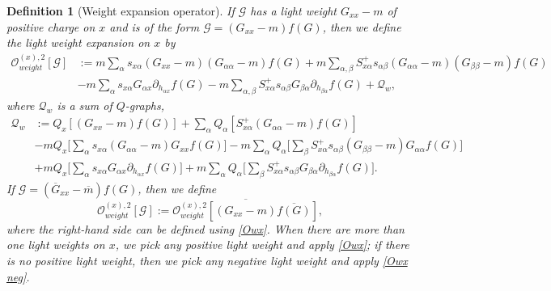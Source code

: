 \documentclass{article}
\newcommand{\1}{\mathds{1}}
\numberwithin{equation}{section}
\newcommand{\al}{\alpha}
\newcommand{\be}{\begin{equation}}
\newcommand{\ee}{\end{equation}}
\renewcommand{\cal}{\mathcal}
\newcommand{\wh}{\widehat}
\theoremstyle{plain} %
\newtheorem{definition}[theorem]{Definition}
\theoremstyle{remark}
\begin{document}
\begin{definition} [Weight expansion operator]
 If $\cal G$ has a light weight $G_{xx}-m$ of positive charge on $x$ and is of  the form $\cal G= (G_{xx}-m)f (G)$,  then we define the light weight expansion on $x$ by  
\begin{align} 
 {\cal O}^{(x),2}_{weight} \left [  \cal G \right] &:=  m \sum_{  \al} s_{x\al}  (G_{xx}-m) (G_{\al\al}-m)f (G) +m \sum_{  \al,\beta}S^{+}_{x\al} s_{\al \beta}  (G_{\al\al}-m) (G_{\beta\beta}-m)f (G) \nonumber\\
 &-  m  \sum_{ \al} s_{x \al} G_{\al x}\partial_{ h_{ \al x}} f (G) -  m \sum_{ \al,\beta} S^{+}_{x\al}s_{\al \beta} G_{\beta \al}\partial_{ h_{ \beta\al}} f(G) + \cal Q_w ,\label{Owx}\end{align}
 where %
 $\cal Q_w$ is a sum of $Q$-graphs,
 \begin{align} 
  \cal Q_w &:=  Q_x \left[(G_{xx}  -  m) f(G)\right] + \sum_{\al} Q_\al \left[  S^{+}_{x\al}(G_{\al\al}  -  m) f(G)\right] \nonumber\\
 & - m  Q_x\Big[ \sum_{\al} s_{x\al}  (G_{\al\al}-m)G_{xx} f(G) \Big]  - m \sum_\al Q_\al\Big[ \sum_{ \beta}S_{x\al}^{+}s_{\al\beta}(G_{\beta\beta}-m)G_{\al\al} f(G) \Big] \nonumber\\
  &+  m  Q_x  \Big[  \sum_\al s_{x \al}  G_{\al x}\partial_{ h_{\al x}} f(G)\Big]+ m \sum_\al Q_\al \Big[  \sum_{ \beta} S^{+}_{x\al}s_{\al \beta} G_{\beta \al}\partial_{ h_{\beta \al}} f(G)\Big]. \nonumber
\end{align} 
If $\cal G= (\overline G_{xx}-\overline m)f (G)$, then we define 
\be\label{Owx neg}
 {\cal O}^{(x),2}_{weight}\left [  \cal G \right] := \overline{ {\cal O}^{(x),2}_{weight} \left [  (G_{xx}  -  m) \overline{f(G)} \right ] } ,
\ee
where the right-hand side can be defined using \eqref{Owx}.
When there are more than one light weights on $x$, we pick any positive light weight and apply \eqref{Owx}; if there is no positive light weight, then we pick any negative light weight and apply \eqref{Owx neg}. 
 

\end{definition}
\end{document}

